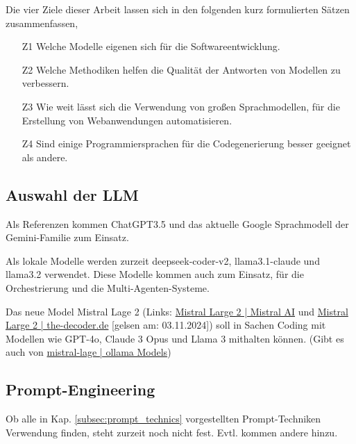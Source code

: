 Die vier Ziele dieser Arbeit lassen sich in den folgenden kurz formulierten Sätzen zusammenfassen,

\begin{itemize}
	\item[Z1] Welche Modelle eigenen sich für die Softwareentwicklung.
	\item[Z2] Welche Methodiken helfen die Qualität der Antworten von Modellen zu verbessern.
	\item[Z3] Wie weit lässt sich die Verwendung von großen Sprachmodellen, für die Erstellung von Webanwendungen automatisieren.
	\item[Z4] Sind einige Programmiersprachen für die Codegenerierung besser geeignet als andere.
\end{itemize}


\subsection{Auswahl der LLM}
\begin{tcolorbox}[
	enhanced,
	colback=yellow!5!white,
	colframe=yellow!75!black!50,
	title= Wird noch im Verlauf der Arbeit geändert
	]
	Als Referenzen kommen ChatGPT3.5 und das aktuelle Google Sprachmodell der Gemini-Familie zum Einsatz.\vspace{0.2cm}

	Als lokale Modelle werden zurzeit deepseek-coder-v2, llama3.1-claude und llama3.2 verwendet. Diese Modelle kommen auch zum Einsatz, für die Orchestrierung und die Multi-Agenten-Systeme.\vspace{0.2cm}
	
	Das neue Model Mistral Lage 2 (Links: \href{https://mistral.ai/news/mistral-large-2407/}{Mistral Large 2 | Mistral AI} und \href{https://the-decoder.de/mistral-large-2-soll-meta-llama-3-in-sachen-effizienz-schlagen-und-der-llm-ozean-wird-roter/}{Mistral Large 2 | the-decoder.de} [gelsen am: 03.11.2024]) soll in Sachen Coding mit Modellen wie GPT-4o, Claude 3 Opus und Llama 3 mithalten können. (Gibt es auch von \href{https://ollama.com/library/mistral-large}{mistral-lage | ollama Models})
\end{tcolorbox}


\subsection{Prompt-Engineering}
\begin{tcolorbox}[
	enhanced,
	colback=yellow!5!white,
	colframe=yellow!75!black!50,
	title= Wird noch im Verlauf der Arbeit geändert
	]
	Ob alle in Kap. \ref{subsec:prompt_technics} vorgestellten Prompt-Techniken Verwendung finden, steht zurzeit noch nicht fest. Evtl. kommen andere hinzu.
\end{tcolorbox}

